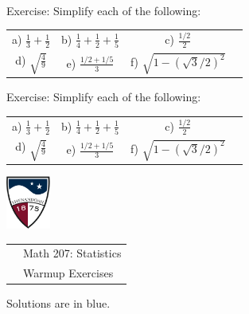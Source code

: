 \documentclass[10pt]{article}
\begin{document}
\eject
{\ }

Exercise: Simplify each of the following:
\newcommand{\MHS}{\hbox{\hspace{1.75in}}}
\begin{center}
\begin{tabular}{cccc}
a) $\frac{1}{3} + \frac{1}{2}$\MHS & b) $\frac{1}{4}+\frac{1}{2}+\frac{1}{5}$\MHS 
  & c) $\frac{1/2}{2}$\\[2in]
d) $\displaystyle\sqrt{\frac{4}{9}}$\MHS        & e) $\displaystyle\frac{1/2 + 1/5}{3}$\MHS   & 
   f) $\displaystyle\sqrt{1-\left(\sqrt{3}/2\right)^2}$
\end{tabular}
\end{center}


\vfill

Exercise: Simplify each of the following:

\begin{center}
\begin{tabular}{cccc}
a) $\frac{1}{3} + \frac{1}{2}$\MHS & b) $\frac{1}{4}+\frac{1}{2}+\frac{1}{5}$\MHS 
  & c) $\frac{1/2}{2}$\\[2in]
d) $\displaystyle\sqrt{\frac{4}{9}}$\MHS        & e) $\displaystyle\frac{1/2 + 1/5}{3}$\MHS   & 
   f) $\displaystyle\sqrt{1-\left(\sqrt{3}/2\right)^2}$
\end{tabular}
\end{center}
\vspace{1.25in}

\eject


\href{http://www.su.edu}{\includegraphics[height=1.75cm]{sulogo.eps}}
\vspace{-1.69cm}

{\small
\begin{tabular}{cl}
\hspace{5in} & Math 207:  Statistics\\
                & Warmup Exercises\\
\end{tabular}
}

\setlength{\baselineskip}{1.05\baselineskip}
\bigskip\bigskip

{\color{blue} Solutions are in blue.}
\medskip
\end{document}
